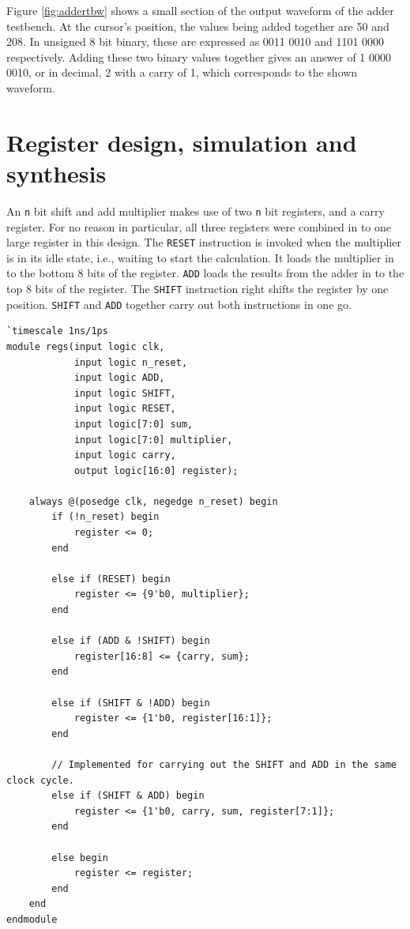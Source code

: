 \documentclass[a4paper,11pt]{article}
\begin{document}
Figure \ref{fig:addertbw} shows a small section of the output waveform of the adder testbench. At the cursor's position, the values being added together are 50 and 208. In unsigned 8 bit binary, these are expressed as 0011 0010 and 1101 0000 respectively. Adding these two binary values together gives an answer of 1 0000 0010, or in decimal, 2 with a carry of 1, which corresponds to the shown waveform.

\section{Register design, simulation and synthesis}
An \lstinline{n} bit shift and add multiplier makes use of two \lstinline{n} bit registers, and a carry register. For no reason in particular, all three registers were combined in to one large register in this design. The \lstinline{RESET} instruction is invoked when the multiplier is in its idle state, i.e., waiting to start the calculation. It loads the multiplier in to the bottom 8 bits of the register. \lstinline{ADD} loads the results from the adder in to the top 8 bits of the register. The \lstinline{SHIFT} instruction right shifts the register by one position. \lstinline{SHIFT} and \lstinline{ADD} together carry out both instructions in one go.

\begin{lstlisting}
`timescale 1ns/1ps
module regs(input logic clk, 
            input logic n_reset,
            input logic ADD,
            input logic SHIFT,
            input logic RESET,
            input logic[7:0] sum,
            input logic[7:0] multiplier,
            input logic carry,
            output logic[16:0] register);

    always @(posedge clk, negedge n_reset) begin
        if (!n_reset) begin
            register <= 0;
        end
        
        else if (RESET) begin
            register <= {9'b0, multiplier};
        end
            
        else if (ADD & !SHIFT) begin
            register[16:8] <= {carry, sum};
        end
            
        else if (SHIFT & !ADD) begin
            register <= {1'b0, register[16:1]};
        end
		
        // Implemented for carrying out the SHIFT and ADD in the same clock cycle.
        else if (SHIFT & ADD) begin
            register <= {1'b0, carry, sum, register[7:1]};
        end
        
        else begin
            register <= register;
        end
    end
endmodule
\end{lstlisting}
\end{document}
